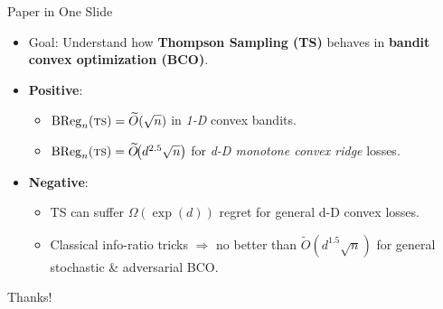 \documentclass{beamer}
\newcommand{\BReg}{\operatorname{BReg}}
\newcommand{\ts}{{\textsc{ts}}}
\begin{document}
\begin{frame}{Paper in One Slide}
    \begin{itemize}
        \item \alert{Goal}: Understand how \textbf{Thompson Sampling (TS)} behaves in \textbf{bandit convex optimization (BCO)}.
        \item \textbf{Positive}:
              \begin{itemize}
                  \item $\BReg_n(\ts) = \widetilde{O}(\sqrt{n})$ in \emph{1-D} convex bandits.
                  \item $\BReg_n(\ts) = \widetilde{O}\!\bigl(d^{2.5}\sqrt{n}\bigr)$ for \emph{d-D monotone convex ridge} losses.
              \end{itemize}
        \item \textbf{Negative}:
              \begin{itemize}
                  \item TS can suffer \(\Omega(\exp(d))\) regret for general d-D convex losses.
                  \item Classical info-ratio tricks \(\Rightarrow\) no better than \(\widetilde{O}(d^{1.5}\sqrt{n})\) for general stochastic \& adversarial BCO.
              \end{itemize}
    \end{itemize}
    \begin{center}
        Thanks!
    \end{center}
\end{frame}

\end{document}
